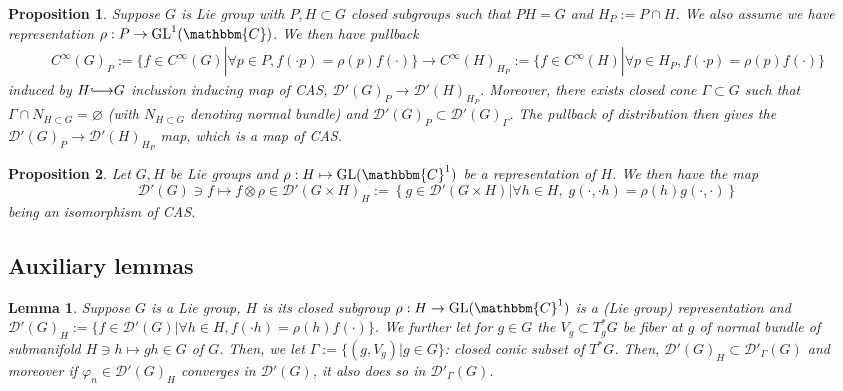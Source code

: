 \documentclass{article}
\newcommand{\assign}{:=}
\newcommand{\longhookrightarrow}{{\lhook\joinrel\relbar\joinrel\rightarrow}}
\newcommand{\tmop}[1]{\ensuremath{\operatorname{#1}}}
\newtheorem{lemma}{Lemma}
\newtheorem{proposition}{Proposition}
{\theorembodyfont{\rmfamily}\newtheorem{remark}{Remark}}
\begin{document}
\begin{proposition}
  \label{CAS:prop-restriction}Suppose $G$ is Lie group with $P, H \subset G$
  closed subgroups such that $P H = G$ and $H_P \assign P \cap H$. We also
  assume we have representation $\rho : P \rightarrow \tmop{GL}^1
  (\mathbbm{C})$. We then have pullback
  \begin{eqnarray}
    & C^{\infty} (G)_P \assign \{ f \in C^{\infty} (G) | \forall p \in P, f
    (\cdot p) = \rho (p) f (\cdot) \} \rightarrow C^{\infty} (H)_{H_P} \assign
    \{ f \in C^{\infty} (H) | \forall p \in H_P, f (\cdot p) = \rho (p) f
    (\cdot) \} &  \nonumber
  \end{eqnarray}
  induced by $H \longhookrightarrow G$ inclusion inducing map of CAS,
  $\mathcal{D}' (G)_P \rightarrow \mathcal{D}' (H)_{H_P}$. Moreover, there
  exists closed cone $\Gamma \subset G$ such that $\Gamma \cap N_{H \subset G}
  = \varnothing$ (with $N_{H \subset G}$ denoting normal bundle) and
  $\mathcal{D}' (G)_P \subset \mathcal{D}' (G)_{\Gamma}$. The pullback of
  distribution then gives the $\mathcal{D}' (G)_P \rightarrow \mathcal{D}'
  (H)_{H_P}$ map, which is a map of CAS.
\end{proposition}

\begin{proposition}
  \label{CAS:prop-proj}Let $G, H$ be Lie groups and $\rho : H \mapsto
  \tmop{GL} (\mathbbm{C}^1)$ be a representation of $H$. We then have the map
  \[ \mathcal{D}' (G) \ni f \mapsto f \otimes \rho \in \mathcal{D}' (G \times
     H)_H \assign \left\{ g \in \mathcal{D}' (G \times H) \big| \forall h
     \in H, \; g (\cdot, \cdot h) = \rho (h) g (\cdot, \cdot) \right\} \]
  being an isomorphism of CAS.
\end{proposition}

\subsection{Auxiliary lemmas}

\begin{lemma}
  \label{CAS:lem-aux}Suppose $G$ is a Lie group, $H$ is its closed subgroup
  $\rho : H \rightarrow \tmop{GL} (\mathbbm{C}^1)$ is a (Lie group)
  representation and $\mathcal{D}' (G)_H \assign \{ f \in \mathcal{D}' (G) |
  \forall h \in H, f (\cdot h) = \rho (h) f (\cdot) \}$. We further let for $g
  \in G$ the $V_g \subset T^{\ast}_g G$ be fiber at $g$ of normal bundle of
  submanifold $H \ni h \mapsto g h \in G$ of $G$. Then, we let $\Gamma \assign
  \{ (g, V_g) | g \in G \}$: closed conic subset of $T^{\ast} G$. Then,
  $\mathcal{D}' (G)_H \subset \mathcal{D}'_{\Gamma} (G)$ and moreover if
  $\varphi_n \in \mathcal{D}' (G)_H$ converges in $\mathcal{D}' (G)$, it also
  does so in $\mathcal{D}'_{\Gamma} (G)$.
\end{lemma}
\end{document}
